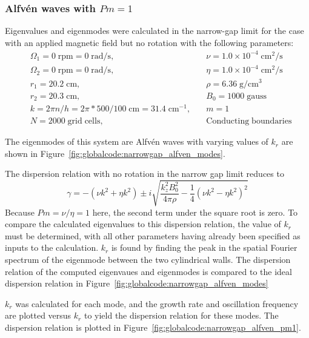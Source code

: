 \documentclass[letterpaper]{article}
\begin{document}
\subsubsection{Alfv\'en waves with $Pm=1$}

Eigenvalues and eigenmodes were calculated in the narrow-gap limit for
the case with an applied magnetic field but no rotation with the
following parameters:
\begin{align*}
&\Omega_1 = 0\;\mathrm{rpm} = 0\;\mathrm{rad/s},\quad
    &\nu = 1.0\times10^{-4}\;\mathrm{cm^2/s}
\\
&\Omega_2 = 0\;\mathrm{rpm} = 0\;\mathrm{rad/s},\quad
    &\eta = 1.0\times10^{-4}\;\mathrm{cm^2/s}
\\
&r_1 = 20.2\;\mathrm{cm},\quad &\rho = 6.36\;\mathrm{g/cm^3}
\\
&r_2 = 20.3\;\mathrm{cm},\quad &B_0 = 1000\; \mathrm{gauss}
\\
&k = 2\pi n/h = 2\pi*500/100\;\mathrm{cm} = 31.4\;\mathrm{cm^{-1}},\quad
    &m=1
\\
&N = 2000\;\mathrm{grid\;cells},\quad &\mathrm{Conducting\;boundaries}
\end{align*}

The eigenmodes of this system are Alfv\'en waves with varying values
of $k_r$ are shown in
Figure~\ref{fig:globalcode:narrowgap_alfven_modes}.

The dispersion relation with no rotation in the narrow gap limit reduces to
\begin{equation}
\gamma = -(\nu k^2 + \eta k^2) 
         \pm i\sqrt{\frac{k_z^2B_0^2}{4\pi\rho} 
                    - \frac{1}{4}\left(\nu k^2 - \eta k^2\right)^2}
\label{eqn:globalcode:alfven_wave_dr}
\end{equation}
Because $Pm=\nu/\eta=1$ here, the second term under the square root is
zero. To compare the calculated eigenvalues to this dispersion
relation, the value of $k_r$ must be determined, with all other
parameters having already been specified as inputs to the
calculation. $k_r$ is found by finding the peak in the spatial Fourier
spectrum of the eigenmode between the two cylindrical walls. The
dispersion relation of the computed eigenvaues and eigenmodes is
compared to the ideal dispersion relation in
Figure~\ref{fig:globalcode:narrowgap_alfven_modes}

$k_r$ was calculated for each mode, and the growth rate and
oscillation frequency are plotted versus $k_r$ to yield the dispersion
relation for these modes.  The dispersion relation is plotted in
Figure~\ref{fig:globalcode:narrowgap_alfven_pm1}.
\end{document}
